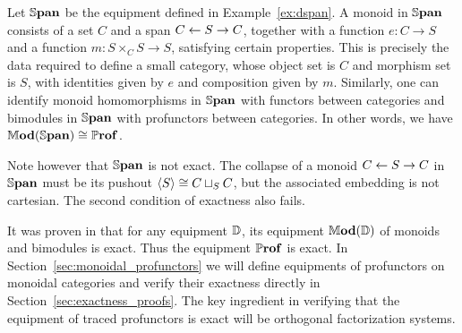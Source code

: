 \documentclass[11pt,oneside,article]{memoir}
\begin{document}
\begin{example}
      \label{ex:mod_span_prof}
   Let $\mathbb{S}\mathbf{pan}$ be the equipment defined in Example~\ref{ex:dspan}. A monoid in $\mathbb{S}\mathbf{pan}$ consists of
   a set $C$ and a span $C\leftarrow S\to C$, together with a function $e\colon C\to S$ and a function
   $m\colon S\times_C S\to S$, satisfying certain properties. This is precisely the data required to
   define a small category, whose object set is $C$ and morphism set is $S$, with identities given
   by $e$ and composition given by $m$. Similarly, one can identify monoid homomorphisms in $\mathbb{S}\mathbf{pan}$
   with functors between categories and bimodules in $\mathbb{S}\mathbf{pan}$ with profunctors between categories.
   In other words, we have $\mathbb{M}\mathbf{od}(\mathbb{S}\mathbf{pan})\cong\mathbb{P}\mathbf{rof}$.

   Note however that $\mathbb{S}\mathbf{pan}$ is not exact. The collapse of a monoid $C\leftarrow S\to C$ in $\mathbb{S}\mathbf{pan}$ must be its pushout $\langle S\rangle\cong C\sqcup_SC$, but the associated embedding is not cartesian. The second condition of exactness also fails.
\end{example}
\begin{remark}
  It was proven in \cite[Proposition~5.2]{Schultz2015} that for any equipment $\mathbb{D}$, its equipment $\mathbb{M}\mathbf{od}(\mathbb{D})$ of monoids and bimodules is exact. Thus the equipment $\mathbb{P}\mathbf{rof}$ is exact.  In Section~\ref{sec:monoidal_profunctors} we will define equipments of profunctors on monoidal categories and verify their exactness directly in Section~\ref{sec:exactness_proofs}.  The key ingredient in verifying that the equipment of traced profunctors is exact will be orthogonal factorization systems.
\end{remark}
\end{document}
